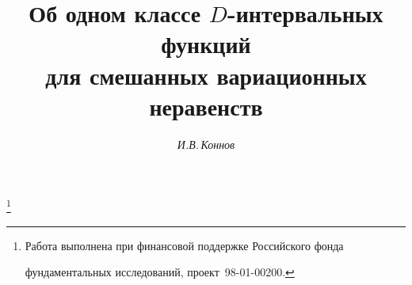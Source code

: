 









\newcommand{\tts}[1]{}







\setcounter{page}{60}















\author{\it И.В.\,Коннов}




\title{Об одном классе $D$-интервальных функций\\


для смешанных вариационных неравенств}


\thanks{Работа выполнена при финансовой поддержке Российского фонда


фундаментальных исследований, проект \No\,98-01-00200.}





\date{}




\pagestyle{plain} %







\maketitle


